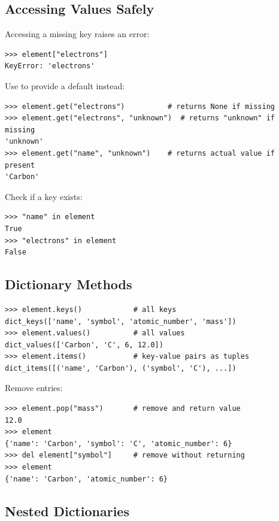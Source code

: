 \subsection{Accessing Values Safely}

Accessing a missing key raises an error:

\begin{lstlisting}
>>> element["electrons"]
KeyError: 'electrons'
\end{lstlisting}

Use  to provide a default instead:

\begin{lstlisting}
>>> element.get("electrons")          # returns None if missing
>>> element.get("electrons", "unknown")  # returns "unknown" if missing
'unknown'
>>> element.get("name", "unknown")    # returns actual value if present
'Carbon'
\end{lstlisting}

Check if a key exists:

\begin{lstlisting}
>>> "name" in element
True
>>> "electrons" in element
False
\end{lstlisting}

\subsection{Dictionary Methods}

\begin{lstlisting}
>>> element.keys()            # all keys
dict_keys(['name', 'symbol', 'atomic_number', 'mass'])
>>> element.values()          # all values
dict_values(['Carbon', 'C', 6, 12.0])
>>> element.items()           # key-value pairs as tuples
dict_items([('name', 'Carbon'), ('symbol', 'C'), ...])
\end{lstlisting}

Remove entries:

\begin{lstlisting}
>>> element.pop("mass")       # remove and return value
12.0
>>> element
{'name': 'Carbon', 'symbol': 'C', 'atomic_number': 6}
>>> del element["symbol"]     # remove without returning
>>> element
{'name': 'Carbon', 'atomic_number': 6}
\end{lstlisting}

\subsection{Nested Dictionaries}

